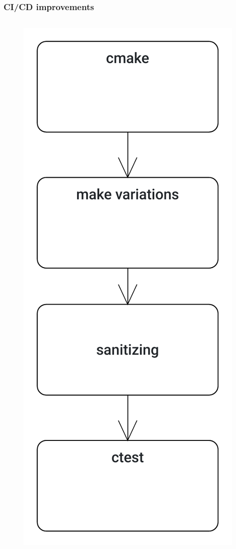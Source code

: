 
\begin{frame}
	\frametitle{CI/CD improvements}
	\begin{columns}
		\begin{column}{0.3\textwidth}
			\begin{figure}
				\centering
				\includegraphics[width=0.55\linewidth]{cicd_old}
				\label{fig:cicdold}
			\end{figure}
			
		\end{column}
		

\end{columns}
\end{frame}
